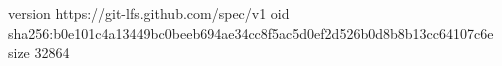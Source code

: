 version https://git-lfs.github.com/spec/v1
oid sha256:b0e101c4a13449bc0beeb694ae34cc8f5ac5d0ef2d526b0d8b8b13cc64107c6e
size 32864
